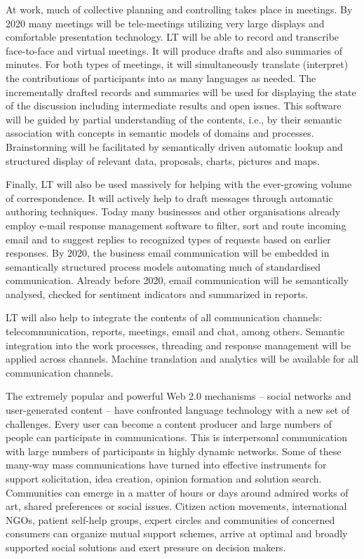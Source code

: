 \begin{multicols}{2}
At work, much of collective planning and controlling takes place in meetings. By 2020 many meetings will be tele-meetings utilizing very large displays and comfortable presentation technology. LT will be able to record and transcribe face-to-face and virtual meetings. It will produce drafts and also summaries of minutes. For both types of meetings, it will simultaneously translate (interpret) the contributions of participants into as many languages as needed. The incrementally drafted records and summaries will be used for displaying the state of the discussion including intermediate results and open issues. This software will be guided by partial understanding of the contents, i.e., by their semantic association with concepts in semantic models of domains and processes. Brainstorming will be facilitated by semantically driven automatic lookup and structured display of relevant data, proposals, charts, pictures and maps.
 
Finally, LT will also be used massively for helping with the ever-growing volume of correspondence. It will actively help to draft messages through automatic authoring techniques. Today many businesses and other organisations already employ e-mail response management software to filter, sort and route incoming email and to suggest replies to recognized types of requests based on earlier responses. By 2020, the business email communication will be embedded in semantically structured process models automating much of standardised communication. Already before 2020, email communication will be semantically analysed, checked for sentiment indicators and summarized in reports.
 
LT will also help to integrate the contents of all communication channels: telecommunication, reports, meetings, email and chat, among others. Semantic integration into the work processes, threading and response management will be applied across channels. Machine translation and analytics will be available for all communication channels.
 
The extremely popular and powerful Web 2.0 mechanisms – social networks and user-generated content – have confronted language technology with a new set of challenges. Every user can become a content producer and large numbers of people can participate in communications. This is interpersonal communication with large numbers of participants in highly dynamic networks. Some of these many-way mass communications have turned into effective instruments for support solicitation, idea creation, opinion formation and solution search. Communities can emerge in a matter of hours or days around admired works of art, shared preferences or social issues. Citizen action movements, international NGOs, patient self-help groups, expert circles and communities of concerned consumers can organize mutual support schemes, arrive at optimal and broadly supported social solutions and exert pressure on decision makers.
 

\end{multicols}
